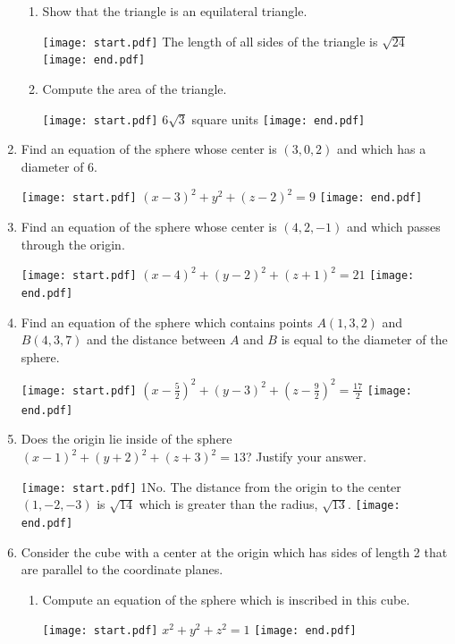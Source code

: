 \documentclass[12pt]{article}
\begin{document}
\begin{enumerate}
\begin{enumerate}
\item Show that the triangle is an equilateral triangle.

\texttt{[image: start.pdf]}
{{The length of all sides of the triangle is $\sqrt{24}$}}
\texttt{[image: end.pdf]}


\item Compute the area of the triangle.

\texttt{[image: start.pdf]}
{{$6\sqrt{3}$ square units}}
\texttt{[image: end.pdf]}


\end{enumerate}

\item Find an equation of the sphere whose center is $(3,0,2)$ and which has a diameter of 6.

\texttt{[image: start.pdf]}
{{$(x-3)^2+y^2+(z-2)^2=9$}}
\texttt{[image: end.pdf]}


\item Find an equation of the sphere whose center is $(4,2,-1)$ and which passes through the origin.

\texttt{[image: start.pdf]}
{{$(x-4)^2+(y-2)^2+(z+1)^2=21$}}
\texttt{[image: end.pdf]}


\item Find an equation of the sphere which contains points $A(1,3,2)$ and $B(4,3,7)$ and the distance between $A$ and $B$ is equal to the diameter of the sphere.

\texttt{[image: start.pdf]}
{{$\left(x-\frac{5}{2}\right)^2+(y-3)^2+\left(z-\frac{9}{2}\right)^2=\frac{17}{2}$}}
\texttt{[image: end.pdf]}


\item Does the origin lie inside of the sphere $(x-1)^2+(y+2)^2+(z+3)^2=13$?  Justify your answer.

\texttt{[image: start.pdf]}
{{{1\linewidth}{No.  The distance from the origin to the center $(1,-2,-3)$ is $\sqrt{14}$ which is greater than the radius, $\sqrt{13}$.}}}
\texttt{[image: end.pdf]}


\item Consider the cube with a center at the origin which has sides of length 2 that are parallel to the coordinate planes.  

\begin{enumerate}

\item Compute an equation of the sphere which is inscribed in this cube.

\texttt{[image: start.pdf]}
{{$x^2+y^2+z^2=1$}}
\texttt{[image: end.pdf]}



\end{enumerate}
\end{enumerate}
\end{document}
